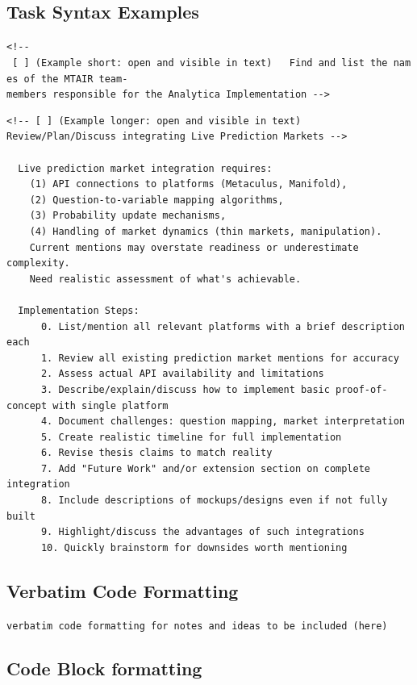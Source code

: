 \documentclass[
  11pt,
  letterpaper,
]{book}
\begin{document}
\subsection*{Task Syntax Examples}\label{task-syntax-examples}

\texttt{\textless{}!-\/-\ {[}\ {]}\ (Example\ short:\ open\ and\ visible\ in\ text)\ \ \ Find\ and\ list\ the\ names\ of\ the\ MTAIR\ team-members\ responsible\ for\ the\ Analytica\ Implementation\ -\/-\textgreater{}}

\begin{verbatim}
<!-- [ ] (Example longer: open and visible in text)    Review/Plan/Discuss integrating Live Prediction Markets -->

  Live prediction market integration requires:
    (1) API connections to platforms (Metaculus, Manifold),
    (2) Question-to-variable mapping algorithms,
    (3) Probability update mechanisms, 
    (4) Handling of market dynamics (thin markets, manipulation).
    Current mentions may overstate readiness or underestimate complexity.
    Need realistic assessment of what's achievable.

  Implementation Steps:
      0. List/mention all relevant platforms with a brief description each
      1. Review all existing prediction market mentions for accuracy
      2. Assess actual API availability and limitations
      3. Describe/explain/discuss how to implement basic proof-of-concept with single platform
      4. Document challenges: question mapping, market interpretation
      5. Create realistic timeline for full implementation
      6. Revise thesis claims to match reality
      7. Add "Future Work" and/or extension section on complete integration
      8. Include descriptions of mockups/designs even if not fully built 
      9. Highlight/discuss the advantages of such integrations
      10. Quickly brainstorm for downsides worth mentioning
\end{verbatim}

\subsection*{Verbatim Code Formatting}\label{verbatim-code-formatting}

\texttt{verbatim\ code\ formatting\ for\ notes\ and\ ideas\ to\ be\ included\ (here)}

\subsection*{Code Block formatting}\label{code-block-formatting}
\end{document}
